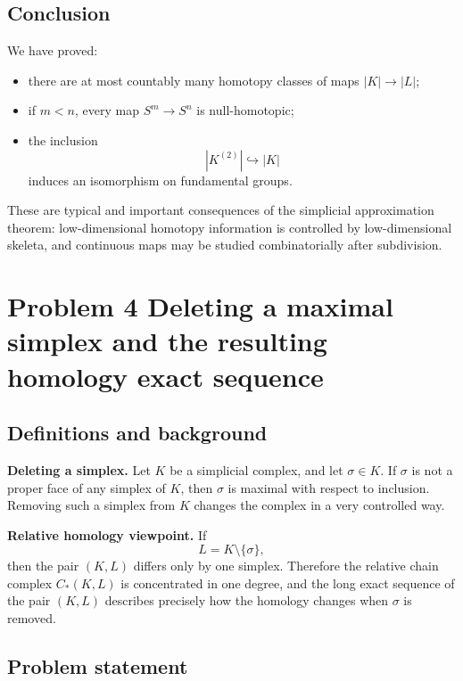 \documentclass[12pt,a4paper]{article}
\theoremstyle{notespace}
\begin{document}
\subsection{Conclusion}

We have proved:

\begin{itemize}
	\item there are at most countably many homotopy classes of maps \(|K|\to |L|\);
	\item if \(m<n\), every map \(S^m\to S^n\) is null-homotopic;
	\item the inclusion
	\[
	|K^{(2)}|\hookrightarrow |K|
	\]
	induces an isomorphism on fundamental groups.
\end{itemize}

These are typical and important consequences of the simplicial approximation theorem: low-dimensional homotopy information is controlled by low-dimensional skeleta, and continuous maps may be studied combinatorially after subdivision.

\bigskip

\section{Problem 4 Deleting a maximal simplex and the resulting homology exact sequence}

\subsection{Definitions and background}

\textbf{Deleting a simplex.}
Let \(K\) be a simplicial complex, and let \(\sigma\in K\). If \(\sigma\) is not a proper face of any simplex of \(K\), then \(\sigma\) is maximal with respect to inclusion. Removing such a simplex from \(K\) changes the complex in a very controlled way.

\medskip

\textbf{Relative homology viewpoint.}
If
\[
L = K\setminus\{\sigma\},
\]
then the pair \((K,L)\) differs only by one simplex. Therefore the relative chain complex \(C_*(K,L)\) is concentrated in one degree, and the long exact sequence of the pair \((K,L)\) describes precisely how the homology changes when \(\sigma\) is removed.

\subsection{Problem statement}
\end{document}

